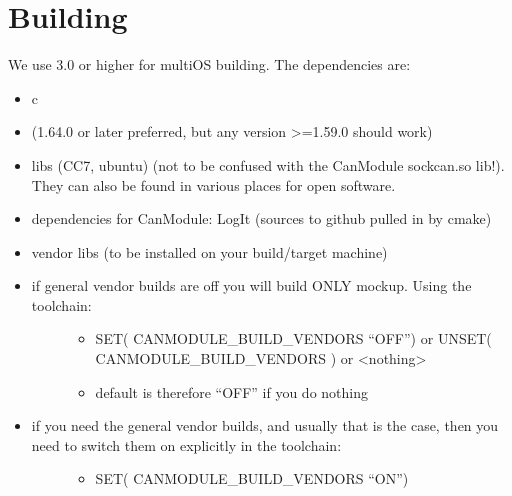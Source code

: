 \documentclass[a4paper,10pt,english]{sphinxmanual}
\begin{document}
\chapter{Building}
\label{\detokenize{building:building}}\label{\detokenize{building::doc}}
\sphinxAtStartPar
We use  3.0 or higher for multi\sphinxhyphen{}OS building.
The dependencies are:
\begin{itemize}
\item {} 
\sphinxAtStartPar
{}\sphinxhyphen{}c

\item {} 
\sphinxAtStartPar
{} (1.64.0 or later preferred, but any version \textgreater{}=1.59.0 should work)

\item {} 
\sphinxAtStartPar
{} libs (CC7, ubuntu) (not to be confused with the CanModule sockcan.so lib!).
They can also be found in various places for open software.

\item {} 
\sphinxAtStartPar
dependencies for CanModule: LogIt (sources to github pulled in by cmake)

\item {} 
\sphinxAtStartPar
vendor libs (to be installed on your build/target machine)

\item {} \begin{description}
\item[{if general vendor builds are off you will build ONLY mockup. Using the toolchain:}] \leavevmode\begin{itemize}
\item {} 
\sphinxAtStartPar
SET( CANMODULE\_BUILD\_VENDORS “OFF”) or UNSET( CANMODULE\_BUILD\_VENDORS ) or \textless{}nothing\textgreater{}

\item {} 
\sphinxAtStartPar
default is therefore “OFF” if you do nothing

\end{itemize}

\end{description}

\item {} \begin{description}
\item[{if you need the general vendor builds, and usually that is the case, then you need to switch them on explicitly in the toolchain:}] \leavevmode\begin{itemize}
\item {} 
\sphinxAtStartPar
SET( CANMODULE\_BUILD\_VENDORS “ON”)


\end{itemize}
\end{description}
\end{itemize}
\end{document}
